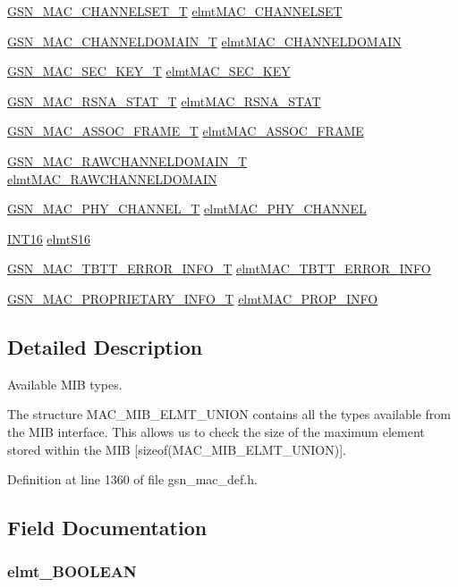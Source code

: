 \begin{DoxyCompactItemize}
\hyperlink{a00114}{GSN\_\-MAC\_\-CHANNELSET\_\-T} \hyperlink{a00117_a48f6cb0d916fd067c112aa63f7e475c0}{elmtMAC\_\-CHANNELSET}
\item 
\hyperlink{a00113}{GSN\_\-MAC\_\-CHANNELDOMAIN\_\-T} \hyperlink{a00117_ab4cdabb1717f0aa93f7aaec8a6e458ee}{elmtMAC\_\-CHANNELDOMAIN}
\item 
\hyperlink{a00131}{GSN\_\-MAC\_\-SEC\_\-KEY\_\-T} \hyperlink{a00117_a9287b7665ae0505b7e4f5356b030e0cd}{elmtMAC\_\-SEC\_\-KEY}
\item 
\hyperlink{a00129}{GSN\_\-MAC\_\-RSNA\_\-STAT\_\-T} \hyperlink{a00117_aa00c240891908a0f850968497361fd9d}{elmtMAC\_\-RSNA\_\-STAT}
\item 
\hyperlink{a00109}{GSN\_\-MAC\_\-ASSOC\_\-FRAME\_\-T} \hyperlink{a00117_a3b6c8517e1ca334ed73c0a10631188a1}{elmtMAC\_\-ASSOC\_\-FRAME}
\item 
\hyperlink{a00127}{GSN\_\-MAC\_\-RAWCHANNELDOMAIN\_\-T} \hyperlink{a00117_a2fbcb3b25bbc2c53ee05af74349cf1ab}{elmtMAC\_\-RAWCHANNELDOMAIN}
\item 
\hyperlink{a00118}{GSN\_\-MAC\_\-PHY\_\-CHANNEL\_\-T} \hyperlink{a00117_ae692d3f28622fb1dcb612cc5c7255969}{elmtMAC\_\-PHY\_\-CHANNEL}
\item 
\hyperlink{a00660_ga57de7cb8e702b1746127a4d5137fa455}{INT16} \hyperlink{a00117_a79e751d8f0c9d9eafac8f74d89c21c48}{elmtS16}
\item 
\hyperlink{a00134}{GSN\_\-MAC\_\-TBTT\_\-ERROR\_\-INFO\_\-T} \hyperlink{a00117_a40687140bc2f34b1025fe15bc0bf2116}{elmtMAC\_\-TBTT\_\-ERROR\_\-INFO}
\item 
\hyperlink{a00123}{GSN\_\-MAC\_\-PROPRIETARY\_\-INFO\_\-T} \hyperlink{a00117_aa9a6a8f63d753fbf6e5070b62a1924fd}{elmtMAC\_\-PROP\_\-INFO}
\end{DoxyCompactItemize}


\subsection{Detailed Description}
Available MIB types. 

The structure MAC\_\-MIB\_\-ELMT\_\-UNION contains all the types available from the MIB interface. This allows us to check the size of the maximum element stored within the MIB \mbox{[}sizeof(MAC\_\-MIB\_\-ELMT\_\-UNION)\mbox{]}. 

Definition at line 1360 of file gsn\_\-mac\_\-def.h.



\subsection{Field Documentation}
\hypertarget{a00117_afad558afce6af6a1364c46c7410f99dd}{
\subsubsection[{elmt\_\-BOOLEAN}]{ {\bf elmt\_\-BOOLEAN}}}
\label{a00117_afad558afce6af6a1364c46c7410f99dd}


